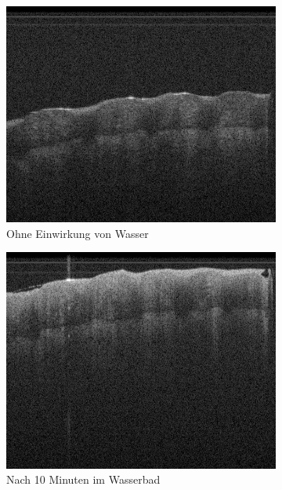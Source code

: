 \documentclass[german, %
parskip=full, %
bibliography=totoc, %
]{scrartcl}
\begin{document}
\begin{figure}[ht]
	\centering
	\begin{subfigure}[b]{0.3\textwidth}
	   \includegraphics[width=\textwidth]{finger_creme_1}
		 \caption{Ohne Einwirkung von Wasser}
	\end{subfigure}
	\begin{subfigure}[b]{0.3\textwidth}
	   \includegraphics[width=\textwidth]{finger_creme_2}
		 \caption{Nach 10 Minuten im Wasserbad}
	\end{subfigure}
	\begin{subfigure}[b]{0.3\textwidth}

\end{subfigure}
\end{figure}
\end{document}
